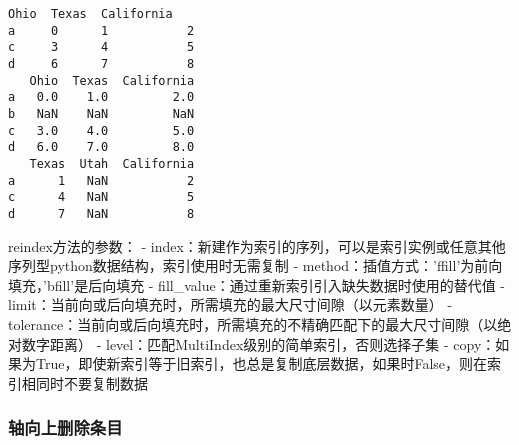 \documentclass[11pt]{article}
\begin{document}
    \begin{Verbatim}[commandchars=\\\{\}]
   Ohio  Texas  California
a     0      1           2
c     3      4           5
d     6      7           8
   Ohio  Texas  California
a   0.0    1.0         2.0
b   NaN    NaN         NaN
c   3.0    4.0         5.0
d   6.0    7.0         8.0
   Texas  Utah  California
a      1   NaN           2
c      4   NaN           5
d      7   NaN           8
    \end{Verbatim}

    reindex方法的参数： -
index：新建作为索引的序列，可以是索引实例或任意其他序列型python数据结构，索引使用时无需复制
- method：插值方式：'ffill'为前向填充，'bfill'是后向填充 -
fill\_value：通过重新索引引入缺失数据时使用的替代值 -
limit：当前向或后向填充时，所需填充的最大尺寸间隙（以元素数量） -
tolerance：当前向或后向填充时，所需填充的不精确匹配下的最大尺寸间隙（以绝对数字距离）
- level：匹配MultiIndex级别的简单索引，否则选择子集 -
copy：如果为True，即使新索引等于旧索引，也总是复制底层数据，如果时False，则在索引相同时不要复制数据

    \hypertarget{ux8f74ux5411ux4e0aux5220ux9664ux6761ux76ee}{%
\subsubsection{轴向上删除条目}\label{ux8f74ux5411ux4e0aux5220ux9664ux6761ux76ee}}
\end{document}
